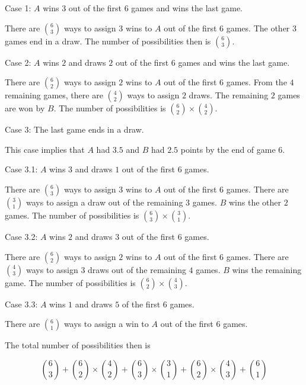 \begin{enumerate}[label=(\alph*)]
  Case 1: $A$ wins $3$ out of the first $6$ games and wins the last game.
  
  There are ${6 \choose 3}$ ways to assign $3$ wins to $A$ out of the first $6$ 
  games. The other $3$ games end in a draw. The number of possibilities then 
  is ${6 \choose 3}$.
  
  Case 2: $A$ wins $2$ and draws $2$ out of the first $6$ games and wins the 
  last game.
  
  There are ${6 \choose 2}$ ways to assign $2$ wins to $A$ out of the first 
  $6$ games. From the $4$ remaining games, there are ${4 \choose 2}$ ways to 
  assign $2$ draws. The remaining $2$ games are won by $B$. The number of 
  possibilities is ${6 \choose 2} \times {4 \choose 2}$.
  
  Case 3: The last game ends in a draw.
  
  This case implies that $A$ had $3.5$ and $B$ had $2.5$ points by the end of 
  game $6$.
  
  Case 3.1: $A$ wins $3$ and draws $1$ out of the first $6$ games.
  
  There are ${6 \choose 3}$ ways to assign $3$ wins to $A$ out of the first 
  $6$ games. There are ${3 \choose 1}$ ways to assign a draw out of the 
  remaining $3$ games. $B$ wins the other $2$ games. The number of 
  possibilities is ${6 \choose 3} \times {3 \choose 1}$.
  
  Case 3.2: $A$ wins $2$ and draws $3$ out of the first $6$ games.
   
  There are ${6 \choose 2}$ ways to assign $2$ wins to $A$ out of the 
  first $6$ games. There are ${4 \choose 3}$ ways to assign $3$ draws out of 
  the remaining $4$ games. $B$ wins the remaining game. The number of 
  possibilities is ${6 \choose 2} \times {4 \choose 3}$.
  
  Case 3.3: $A$ wins $1$ and draws $5$ of the first $6$ games.
  
  There are ${6 \choose 1}$ ways to assign a win to $A$ out of the first 
  $6$ games.
  
  The total number of possibilities then is
  
  $$ {6 \choose 3} + {6 \choose 2} \times {4 \choose 2} + {6 \choose 3} \times 
  {3 \choose 1} + {6 \choose 2} \times {4 \choose 3} + {6 \choose 1}$$
\end{enumerate}